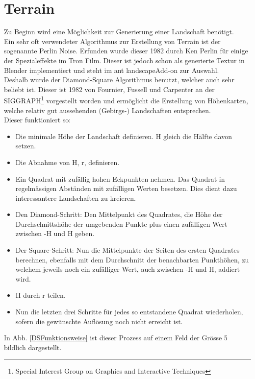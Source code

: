 \documentclass[12pt,twoside]{book}
\begin{document}
\section {Terrain}

Zu Beginn wird eine M\"oglichkeit zur Generierung einer Landschaft ben\"otigt.
\\
Ein sehr oft verwendeter Algorithmus zur Erstellung von Terrain ist der sogenannte Perlin Noise. Erfunden wurde dieser 1982 durch Ken Perlin f\"ur einige der Spezialeffekte im Tron Film.
Dieser ist jedoch schon als generierte Textur in Blender implementiert und steht im \glqq ant landscape\grqq{ }Add-on zur Auswahl.
\\
Deshalb wurde der Diamond-Square Algorithmus benutzt, welcher auch sehr beliebt ist. Dieser ist 1982 von Fournier, Fussell und Carpenter an der \glqq SIGGRAPH\grqq{ }\footnote{Special Interest Group on Graphics and Interactive Techniques} vorgestellt worden und erm\"oglicht die Erstellung von H\"ohenkarten, welche relativ gut aussehenden (Gebirgs-) Landschaften entsprechen. 
\\
Dieser funktioniert so:
\begin{itemize}
\itemsep0em
\item Die minimale H\"ohe der Landschaft definieren. H gleich die H\"alfte davon setzen.
\item Die Abnahme von H, r, definieren.
\item Ein Quadrat mit zuf\"allig hohen Eckpunkten nehmen. Das Quadrat in regelm\"assigen Abst\"anden mit zuf\"alligen Werten besetzen. Dies dient dazu interessantere Landschaften zu kreieren.
\item Den Diamond-Schritt: Den Mittelpunkt des Quadrates, die H\"ohe der Durchschnittsh\"ohe der umgebenden Punkte plus einen zuf\"alligen Wert zwischen -H und H geben.
\item Der Square-Schritt:  Nun die Mittelpunkte der Seiten des ersten Quadrates berechnen, ebenfalls mit dem Durchschnitt der benachbarten Punkth\"ohen, zu welchem jeweils noch ein zuf\"alliger Wert, auch zwischen -H und H, addiert wird.
\item H durch r teilen.
\item Nun die letzten drei Schritte f\"ur jedes so entstandene Quadrat wiederholen, sofern die gew\"unschte Aufl\"osung noch nicht erreicht ist.
\end{itemize}

In Abb. \ref{DSFunktionsweise} ist dieser Prozess auf einem Feld der Gr\"osse 5 bildlich dargestellt.
\end{document}
